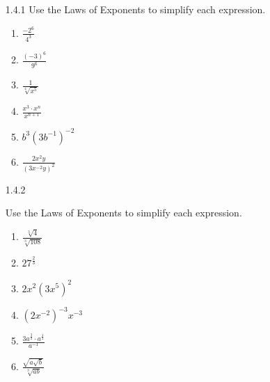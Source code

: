 \documentclass{article}
\begin{document}
\thispagestyle{fancy}
\cfoot{\thepage}


\begin{enumerate}
    \item[1.4.1]
        Use the Laws of Exponents to simplify each expression.
        \begin{enumerate}
            \item
                $ \displaystyle  \frac{-2^{6}}{4^{3}}$
            \item
                $ \displaystyle  \frac{(-3)^{6}}{9^{6}}$
            \item
                $\displaystyle \frac{1}{\sqrt[4]{x^{5}}}$
            \item
                $\displaystyle \frac{x^{3} \cdot x^{n}}{x^{n+1}}$
            \item
                $\displaystyle b^{3} (3 b^{-1})^{-2}$
            \item
                $\displaystyle \frac{2x^{2}y}{(3x^{-2}y)^{2}}$
        \end{enumerate}

        \vspace{6cm}

    \item[1.4.2]

        Use the Laws of Exponents to simplify each expression.
        \begin{enumerate}
            \item
                $\displaystyle \frac{\sqrt[3]{4}}{\sqrt[3]{108}}$
            \item
                $\displaystyle 27^{\frac{2}{3}}$
            \item
                $\displaystyle 2x^{2}(3x^{5})^{2}$
            \item
                $\displaystyle (2x^{-2})^{-3}x^{-3}$
            \item
                $\displaystyle \frac{3a^{\frac{3}{2}} \cdot a^{\frac{1}{2}}}{a^{-1}}$
            \item
                $\displaystyle \frac{\sqrt{a \sqrt{b}}}{\sqrt[3]{ab}}$
        \end{enumerate}

        \newpage


\end{enumerate}
\end{document}
